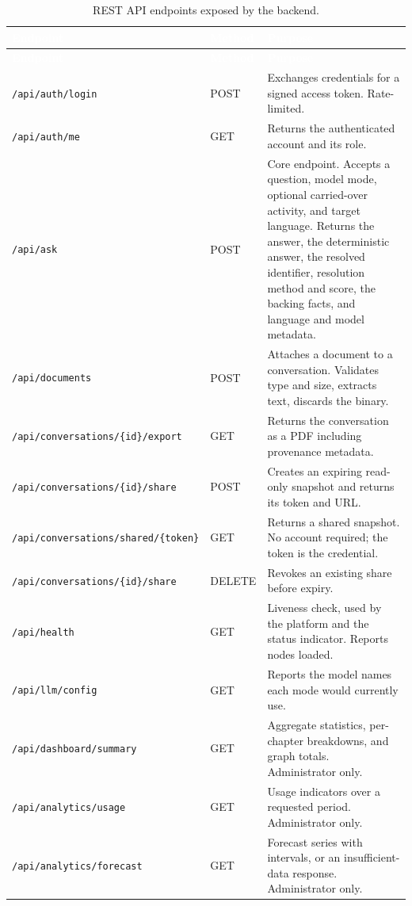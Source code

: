 \begin{longtable}{|p{}|p{}|p{}|}
\caption{REST API endpoints exposed by the backend.}\label{tab:api}\\
\hline
\rowcolor{myblue}\textcolor{white}{\textbf{Endpoint}} & \textcolor{white}{\textbf{Method}} & \textcolor{white}{\textbf{Purpose}} \\
\hline
\endfirsthead
\hline
\rowcolor{myblue}\textcolor{white}{\textbf{Endpoint}} & \textcolor{white}{\textbf{Method}} & \textcolor{white}{\textbf{Purpose}} \\
\hline
\endhead
\texttt{/api/auth/login} & POST & Exchanges credentials for a signed access token. Rate-limited. \\ \hline
\texttt{/api/auth/me} & GET & Returns the authenticated account and its role. \\ \hline
\texttt{/api/ask} & POST & Core endpoint. Accepts a question, model mode, optional carried-over activity, and target language. Returns the answer, the deterministic answer, the resolved identifier, resolution method and score, the backing facts, and language and model metadata. \\ \hline
\texttt{/api/documents} & POST & Attaches a document to a conversation. Validates type and size, extracts text, discards the binary. \\ \hline
\texttt{/api/conversations/\{id\}/export} & GET & Returns the conversation as a PDF including provenance metadata. \\ \hline
\texttt{/api/conversations/\{id\}/share} & POST & Creates an expiring read-only snapshot and returns its token and URL. \\ \hline
\texttt{/api/conversations/shared/\{token\}} & GET & Returns a shared snapshot. No account required; the token is the credential. \\ \hline
\texttt{/api/conversations/\{id\}/share} & DELETE & Revokes an existing share before expiry. \\ \hline
\texttt{/api/health} & GET & Liveness check, used by the platform and the status indicator. Reports nodes loaded. \\ \hline
\texttt{/api/llm/config} & GET & Reports the model names each mode would currently use. \\ \hline
\texttt{/api/dashboard/summary} & GET & Aggregate statistics, per-chapter breakdowns, and graph totals. Administrator only. \\ \hline
\texttt{/api/analytics/usage} & GET & Usage indicators over a requested period. Administrator only. \\ \hline
\texttt{/api/analytics/forecast} & GET & Forecast series with intervals, or an insufficient-data response. Administrator only. \\ \hline
\end{longtable}

